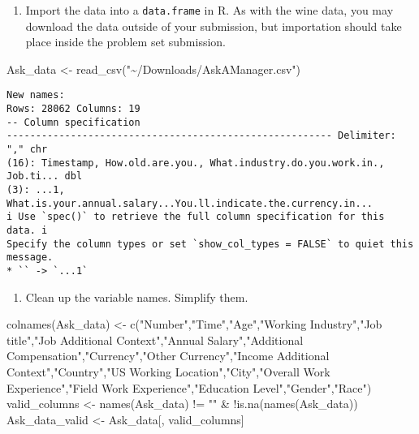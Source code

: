 \documentclass[
  letterpaper,
  DIV=11,
  numbers=noendperiod]{scrartcl}
\newenvironment{Shaded}{\begin{snugshade}}{\end{snugshade}}
\newcommand{\FunctionTok}[1]{\textcolor[rgb]{0.28,0.35,0.67}{#1}}
\newcommand{\NormalTok}[1]{\textcolor[rgb]{0.00,0.23,0.31}{#1}}
\newcommand{\OtherTok}[1]{\textcolor[rgb]{0.00,0.23,0.31}{#1}}
\newcommand{\SpecialCharTok}[1]{\textcolor[rgb]{0.37,0.37,0.37}{#1}}
\newcommand{\StringTok}[1]{\textcolor[rgb]{0.13,0.47,0.30}{#1}}
\providecommand{\tightlist}{%
  \setlength{\itemsep}{0pt}\setlength{\parskip}{0pt}}\usepackage{longtable,booktabs,array}
\begin{document}
\begin{enumerate}
\def\labelenumi{\alph{enumi}.}
\tightlist
\item
  Import the data into a \texttt{data.frame} in R. As with the wine
  data, you may download the data outside of your submission, but
  importation should take place inside the problem set submission.
\end{enumerate}

\begin{Shaded}
\begin{Highlighting}[]
\NormalTok{Ask\_data }\OtherTok{\textless{}{-}} \FunctionTok{read\_csv}\NormalTok{(}\StringTok{"\textasciitilde{}/Downloads/AskAManager.csv"}\NormalTok{)}
\end{Highlighting}
\end{Shaded}

\begin{verbatim}
New names:
Rows: 28062 Columns: 19
-- Column specification
-------------------------------------------------------- Delimiter: "," chr
(16): Timestamp, How.old.are.you., What.industry.do.you.work.in., Job.ti... dbl
(3): ...1, What.is.your.annual.salary...You.ll.indicate.the.currency.in...
i Use `spec()` to retrieve the full column specification for this data. i
Specify the column types or set `show_col_types = FALSE` to quiet this message.
* `` -> `...1`
\end{verbatim}

\begin{enumerate}
\def\labelenumi{\alph{enumi}.}
\setcounter{enumi}{1}
\tightlist
\item
  Clean up the variable names. Simplify them.
\end{enumerate}

\begin{Shaded}
\begin{Highlighting}[]
\FunctionTok{colnames}\NormalTok{(Ask\_data) }\OtherTok{\textless{}{-}} \FunctionTok{c}\NormalTok{(}\StringTok{"Number"}\NormalTok{,}\StringTok{"Time"}\NormalTok{,}\StringTok{"Age"}\NormalTok{,}\StringTok{"Working Industry"}\NormalTok{,}\StringTok{"Job title"}\NormalTok{,}\StringTok{"Job Additional Context"}\NormalTok{,}\StringTok{"Annual Salary"}\NormalTok{,}\StringTok{"Additional Compensation"}\NormalTok{,}\StringTok{"Currency"}\NormalTok{,}\StringTok{"Other Currency"}\NormalTok{,}\StringTok{"Income Additional Context"}\NormalTok{,}\StringTok{"Country"}\NormalTok{,}\StringTok{"US Working Location"}\NormalTok{,}\StringTok{"City"}\NormalTok{,}\StringTok{"Overall Work Experience"}\NormalTok{,}\StringTok{"Field Work Experience"}\NormalTok{,}\StringTok{"Education Level"}\NormalTok{,}\StringTok{"Gender"}\NormalTok{,}\StringTok{"Race"}\NormalTok{)}
\NormalTok{valid\_columns }\OtherTok{\textless{}{-}} \FunctionTok{names}\NormalTok{(Ask\_data) }\SpecialCharTok{!=} \StringTok{""} \SpecialCharTok{\&} \SpecialCharTok{!}\FunctionTok{is.na}\NormalTok{(}\FunctionTok{names}\NormalTok{(Ask\_data))}
\NormalTok{Ask\_data\_valid }\OtherTok{\textless{}{-}}\NormalTok{ Ask\_data[, valid\_columns]}
\end{Highlighting}
\end{Shaded}
\end{document}
